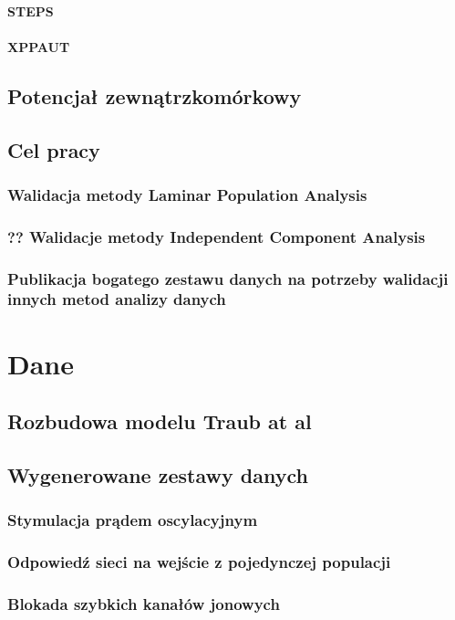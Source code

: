 \documentclass[a4paper,12pt,polish]{book}
\begin{document}
\subsubsection{STEPS}
\subsubsection{XPPAUT}
\section{Potencjał zewnątrzkomórkowy}


\section{Cel pracy}
\subsection{Walidacja metody Laminar Population Analysis}
\subsection{??  Walidacje metody Independent Component Analysis}
\subsection{Publikacja bogatego zestawu danych na potrzeby walidacji innych metod analizy danych}


\chapter{Dane}

\section{Rozbudowa modelu Traub at al}
\section{Wygenerowane zestawy danych}
\subsection{Stymulacja prądem oscylacyjnym}
\subsection{Odpowiedź sieci na wejście z pojedynczej populacji}
\subsection{Blokada szybkich kanałów jonowych}
\end{document}
